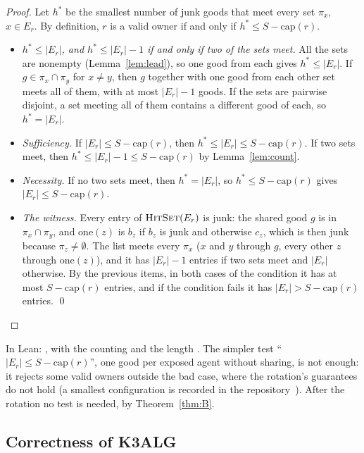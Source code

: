 \documentclass[runningheads,11pt]{llncs}
\newcommand{\capa}{\mathrm{cap}}
\newcommand{\HitSet}{\textup{\textsc{HitSet}}}
\begin{document}
\begin{proof}
Let $h^*$ be the smallest number of junk goods that meet every set $\pi_x$, $x\in E_r$. By definition, $r$ is a valid owner if and only if $h^*\le S-\capa(r)$.
\begin{itemize}
\item \emph{$h^*\le|E_r|$, and $h^*\le|E_r|-1$ if and only if two of the sets meet.} All the sets are nonempty (Lemma~\ref{lem:lead}), so one good from each gives $h^*\le|E_r|$. If $g\in\pi_x\cap\pi_y$ for $x\ne y$, then $g$ together with one good from each other set meets all of them, with at most $|E_r|-1$ goods. If the sets are pairwise disjoint, a set meeting all of them contains a different good of each, so $h^*=|E_r|$.
\item \emph{Sufficiency.} If $|E_r|\le S-\capa(r)$, then $h^*\le|E_r|\le S-\capa(r)$. If two sets meet, then $h^*\le|E_r|-1\le S-\capa(r)$ by Lemma~\ref{lem:count}.
\item \emph{Necessity.} If no two sets meet, then $h^*=|E_r|$, so $h^*\le S-\capa(r)$ gives $|E_r|\le S-\capa(r)$.
\item \emph{The witness.} Every entry of $\HitSet(E_r)$ is junk: the shared good $g$ is in $\pi_x\cap\pi_y$, and $\mathrm{one}(z)$ is $b_z$ if $b_z$ is junk and otherwise $c_z$, which is then junk because $\pi_z\ne\emptyset$. The list meets every $\pi_x$ ($x$ and $y$ through $g$, every other $z$ through $\mathrm{one}(z)$), and it has $|E_r|-1$ entries if two sets meet and $|E_r|$ otherwise. By the previous items, in both cases of the condition it has at most $S-\capa(r)$ entries, and if the condition fails it has $|E_r|>S-\capa(r)$ entries. \qed
\end{itemize}
\end{proof}

\noindent In Lean: , with the counting  and the length . The simpler test ``$|E_r|\le S-\capa(r)$'', one good per exposed agent without sharing, is not enough: it rejects some valid owners outside the bad case, where the rotation's guarantees do not hold (a smallest configuration is recorded in the repository~\cite{Repo}). After the rotation no test is needed, by Theorem~\ref{thm:B}.

\subsection{Correctness of K3ALG}\label{sec:k3correct}
\end{document}
